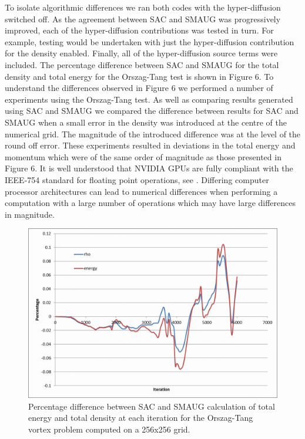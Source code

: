  To isolate algorithmic differences we ran both codes with the hyper-diffusion switched off. As the agreement between SAC and SMAUG was progressively improved, each of the hyper-diffusion contributions was tested in turn. For example, testing would be undertaken with just the hyper-diffusion contribution for the density enabled. Finally, all of the hyper-diffusion  source terms were included. The percentage difference between SAC and SMAUG for the total density and total energy for the Orszag-Tang test is shown in Figure 6. To understand the differences observed in Figure 6  we performed a number of experiments using the Orszag-Tang test. As well as comparing results generated using SAC and SMAUG we compared the difference between results for SAC and SMAUG when a small error in the density was introduced at the centre of the numerical grid. The magnitude of the introduced difference was at the level of the round off error. These experiments resulted in deviations in the total energy and momentum which were of the same order of magnitude as those presented in Figure 6. It is well understood that NVIDIA GPUs are fully compliant with the IEEE-754 standard for floating point operations, see \citep{Whitehead 2011}. Differing computer processor architectures can lead to numerical differences when performing a computation with a large number of operations which may have large differences in magnitude.\\





\begin{figure}[h]
\includegraphics[scale=0.9]{figure6_percentenergydensitydifference_ozt_sacsmaug_tp5.jpg}
\caption{Percentage difference between SAC and SMAUG calculation of total energy and total density at each iteration for the Orszag-Tang vortex problem computed on a 256x256 grid.}
\end{figure}



